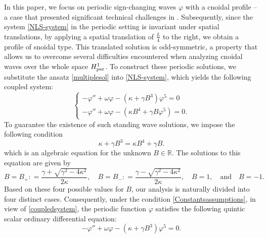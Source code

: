 \documentclass[10pt,reqno,a4paper]{amsart} %
\theoremstyle{definition} %
\numberwithin{equation}{section}
\numberwithin{figure}{section}
\begin{document}
In this paper, we focus on periodic sign-changing waves $\varphi$ with a cnoidal profile -- a case that presented significant technical challenges in \cite{NataliBittencourt2024}. Subsequently, since the system \eqref{NLS-system} in the periodic setting is invariant under spatial translations,   by applying a spatial translation of $\frac{L}{4}$ to the right, we obtain a profile of snoidal type. This translated solution is odd-symmetric, a property that allows us to overcome several difficulties encountered when analyzing cnoidal waves over the whole space $H^1_{\rm per}$. To construct these periodic solutions, we substitute the ansatz \eqref{multiplesol} into \eqref{NLS-system}, which yields the following coupled system:
\begin{equation}\label{coupledsystem}
\begin{cases}
-\varphi'' + \omega \varphi - (\kappa + \gamma B^3)\varphi^5 = 0 \\
-\varphi'' + \omega \varphi - (\kappa B^4 + \gamma B \varphi^5) = 0. %
\end{cases}
\end{equation}
To guarantee the existence of such standing wave solutions, we impose the following condition
\begin{equation}\label{Constantsassumptions}
    \kappa + \gamma B^3 = \kappa B^4 + \gamma B.
\end{equation}
which is an algebraic equation for the unknown $B \in \mathbb{R}$. The solutions to this equation are given by
\begin{equation}\label{Bvalue}
B = B_+: = \frac{\gamma + \sqrt{\gamma^2 - 4\kappa^2}}{2\kappa}, \quad B = B_-: = \frac{\gamma - \sqrt{\gamma^2 - 4\kappa^2}}{2\kappa}, \quad B = 1, \quad \text{and} \quad B = -1.
\end{equation}
Based on these four possible values for $B$, our analysis is naturally divided into four distinct cases. Consequently, under the condition \eqref{Constantsassumptions}, in view of \eqref{coupledsystem}, the periodic function $\varphi$ satisfies the following quintic scalar ordinary differential equation:
\begin{equation}\label{mainEDOquinticsystemIntroduction}
     -\varphi'' + \omega \varphi - (\kappa + \gamma B^3)\varphi^5 = 0.
\end{equation}
\end{document}
